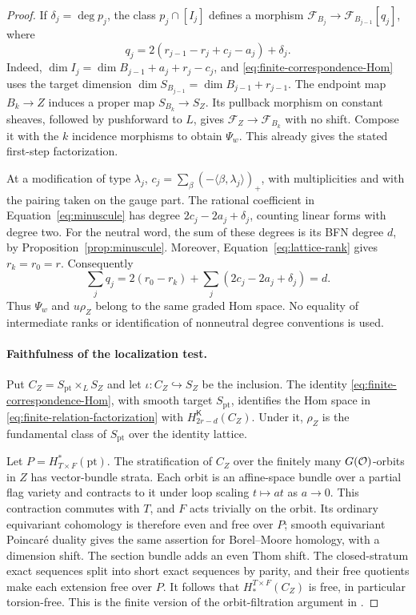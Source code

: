 \begin{proof}
If $\delta_j=\deg p_j$, the class $p_j\cap[I_j]$ defines a morphism
$\mathcal F_{B_j}\to\mathcal F_{B_{j-1}}[q_j]$, where
\begin{equation}
 \label{eq:chain-shift}
 q_j=2(r_{j-1}-r_j+c_j-a_j)+\delta_j.
\end{equation}
Indeed, $\dim I_j=\dim B_{j-1}+a_j+r_j-c_j$, and
\eqref{eq:finite-correspondence-Hom} uses the target dimension
$\dim S_{B_{j-1}}=\dim B_{j-1}+r_{j-1}$.
The endpoint map $B_k\to Z$ induces a proper map $S_{B_k}\to S_Z$.
Its pullback morphism on constant sheaves, followed by pushforward to
$L$, gives $\mathcal F_Z\to\mathcal F_{B_k}$ with no shift.
Compose it with the $k$ incidence morphisms to obtain $\Psi_w$.
This already gives the stated first-step factorization.

At a modification of type $\lambda_j$,
$c_j=\sum_\beta(-\langle\beta,\lambda_j\rangle)_+$, with multiplicities
and with the pairing taken on the gauge part.  The rational coefficient
in Equation~\eqref{eq:minuscule} has degree $2c_j-2a_j+\delta_j$,
counting linear forms with degree two.  For the neutral word, the sum of
these degrees is its BFN degree $d$, by
Proposition~\ref{prop:minuscule}.  Moreover,
Equation~\eqref{eq:lattice-rank} gives $r_k=r_0=r$.  Consequently
\[
 \sum_jq_j
 =2(r_0-r_k)+\sum_j(2c_j-2a_j+\delta_j)=d.
\]
Thus $\Psi_w$ and $u\rho_Z$ belong to the same graded Hom space.
No equality of intermediate ranks or identification of nonneutral degree
conventions is used.

\paragraph{Faithfulness of the localization test.}
Put $C_Z=S_{\mathrm{pt}}\times_LS_Z$ and let $\iota:C_Z\hookrightarrow
S_Z$ be the inclusion.  The identity
\eqref{eq:finite-correspondence-Hom}, with smooth target
$S_{\mathrm{pt}}$, identifies the Hom space in
\eqref{eq:finite-relation-factorization} with
$H^{\mathsf K}_{2r-d}(C_Z)$.  Under it, $\rho_Z$ is the fundamental class
of $S_{\mathrm{pt}}$ over the identity lattice.

Let $P=H^*_{T\times F}(\mathrm{pt})$.  The stratification of $C_Z$ over
the finitely many $G(\mathcal O)$-orbits in $Z$ has vector-bundle strata.  Each
orbit is an affine-space bundle over a partial flag variety and contracts
to it under loop scaling $t\mapsto at$ as $a\to0$.  This contraction
commutes with $T$, and $F$ acts trivially on the orbit.  Its ordinary
equivariant cohomology is therefore even and free over $P$; smooth
equivariant Poincar\'e duality gives the same assertion for Borel--Moore
homology, with a dimension shift.  The section bundle adds an even Thom
shift.
The closed-stratum exact sequences split into short exact sequences by
parity, and their free quotients make each extension free over $P$.
It follows that $H_*^{T\times F}(C_Z)$ is free, in particular
torsion-free.  This is the finite version of the orbit-filtration argument
in \cite[Lemmas~2.5--2.6]{BFN18}.


\end{proof}
